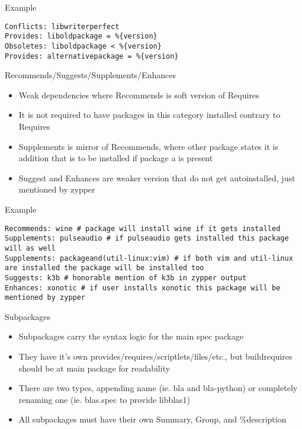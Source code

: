 \documentclass{beamer}
\begin{document}
\begin{frame}[fragile]{Example}
	\begin{small}
	\begin{verbatim}
Conflicts: libwriterperfect
Provides: liboldpackage = %{version}
Obsoletes: liboldpackage < %{version}
Provides: alternativepackage = %{version}
	\end{verbatim}
	\end{small}
\end{frame}

\begin{frame}[t]{Recommends/Suggests/Supplements/Enhances}
	\begin{itemize}
	\item Weak dependencies where Recommends is soft version of Requires
    \item It is not required to have packages in this category installed contrary to Requires
    \item Supplements is mirror of Recommends, where other package states it is addition that is to be installed if package a is present
    \item Suggest and Enhances are weaker version that do not get autoinstalled, just mentioned by zypper
	\end{itemize}
\end{frame}

\begin{frame}[fragile]{Example}
	\begin{small}
	\begin{verbatim}
Recommends: wine # package will install wine if it gets installed
Supplements: pulseaudio # if pulseaudio gets installed this package will as well
Supplements: packageand(util-linux:vim) # if both vim and util-linux are installed the package will be installed too
Suggests: k3b # honorable mention of k3b in zypper output
Enhances: xonotic # if user installs xonotic this package will be mentioned by zypper
	\end{verbatim}
	\end{small}
\end{frame}

\begin{frame}[t]{Subpackages}
	\begin{itemize}
	\item Subpackages carry the syntax logic for the main spec package
    \item They have it's own provides/requires/scriptlets/files/etc., but buildrequires should be at main package for readability
    \item There are two types, appending name (ie. bla and bla-python) or completely renaming one (ie. blas.spec to provide libblas1)
    \item All subpackages must have their own Summary, Group, and \%description
	\end{itemize}
\end{frame}
\end{document}
